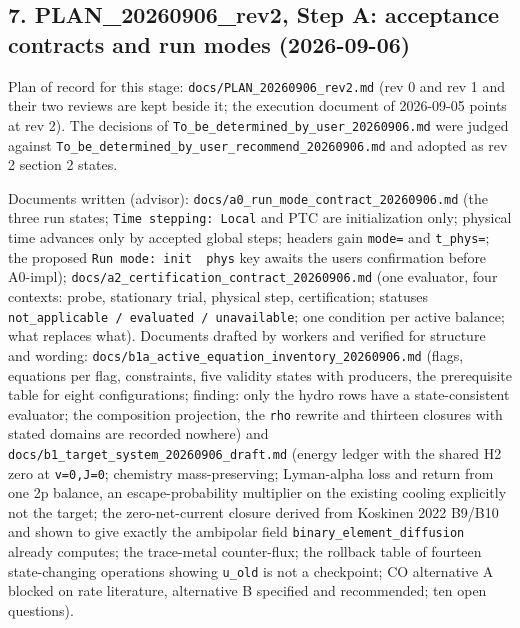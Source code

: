 \documentclass[english,a4paper]{my_memo}
\begin{document}
\subsection{7. PLAN\_20260906\_rev2, Step A: acceptance contracts and run modes (2026-09-06)}\label{7-plan_20260906_rev2-step-a-acceptance-contracts-and-run-modes-2026-09-06}

Plan of record for this stage: \texttt{docs/PLAN\_20260906\_rev2.md} (rev 0 and rev 1
and their two reviews are kept beside it; the execution document of
2026-09-05 points at rev 2). The decisions of \texttt{To\_be\_determined\_by\_user\_20260906.md}
were judged against \texttt{To\_be\_determined\_by\_user\_recommend\_20260906.md} and
adopted as rev 2 section 2 states.

Documents written (advisor): \texttt{docs/a0\_run\_mode\_contract\_20260906.md} (the
three run states; \texttt{Time\ stepping:\ Local} and PTC are initialization only;
physical time advances only by accepted global steps; headers gain \texttt{mode=} and
\texttt{t\_phys=}; the proposed \texttt{Run\ mode:\ init\ \textbar{}\ phys} key awaits the user\textquotesingle s
confirmation before A0-impl); \texttt{docs/a2\_certification\_contract\_20260906.md}
(one evaluator, four contexts: probe, stationary trial, physical step,
certification; statuses \texttt{not\_applicable\ /\ evaluated\ /\ unavailable}; one
condition per active balance; what replaces what). Documents drafted by
workers and verified for structure and wording:
\texttt{docs/b1a\_active\_equation\_inventory\_20260906.md} (flags, equations per flag,
constraints, five validity states with producers, the prerequisite table for
eight configurations; finding: only the hydro rows have a state-consistent
evaluator; the composition projection, the \texttt{rho} rewrite and thirteen closures
with stated domains are recorded nowhere) and
\texttt{docs/b1\_target\_system\_20260906\_draft.md} (energy ledger with the shared H2
zero at \texttt{v=0,J=0}; chemistry mass-preserving; Lyman-alpha loss and return
from one 2p balance, an escape-probability multiplier on the existing
cooling explicitly not the target; the zero-net-current closure derived from
Koskinen 2022 B9/B10 and shown to give exactly the ambipolar field
\texttt{binary\_element\_diffusion} already computes; the trace-metal counter-flux;
the rollback table of fourteen state-changing operations showing \texttt{u\_old} is
not a checkpoint; CO alternative A blocked on rate literature, alternative B
specified and recommended; ten open questions).
\end{document}
